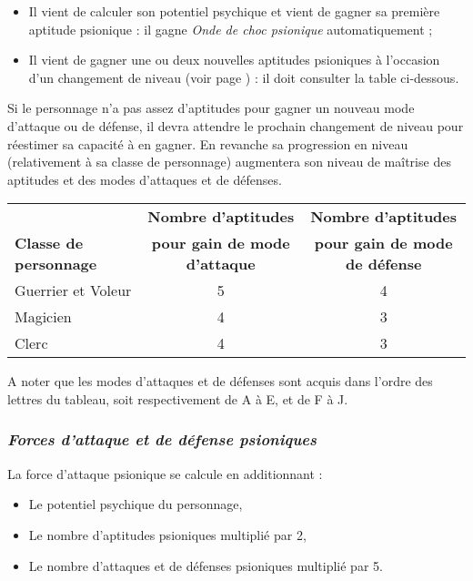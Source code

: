 \bigskip

\begin{itemize}
\item Il vient de calculer son potentiel psychique et vient de gagner sa première aptitude psionique : il gagne \textit{Onde de choc psionique} automatiquement ;
\item Il vient de gagner une ou deux nouvelles aptitudes psioniques à l'occasion d'un changement de niveau (voir page \pageref{aptitudes-gain}) : il doit consulter la table ci-dessous.
\end{itemize}

\bigskip

Si le personnage n'a pas assez d'aptitudes pour gagner un nouveau mode d'attaque ou de défense, il devra attendre le prochain changement de niveau pour réestimer sa capacité à en gagner. En revanche sa progression en niveau (relativement à sa classe de personnage) augmentera son niveau de maîtrise des aptitudes et des modes d'attaques et de défenses.


\bigskip

\begin{tabular}{lcc}
& \textbf{Nombre d'aptitudes} & \textbf{Nombre d'aptitudes} \\
\textbf{Classe de personnage} & \textbf{pour gain de mode d'attaque} & \textbf{pour gain de mode de défense} \\
Guerrier et Voleur & 5 & 4 \\
Magicien & 4 & 3 \\
Clerc & 4 & 3 \\
\end{tabular}

\bigskip

A noter que les modes d'attaques et de défenses sont acquis dans l'ordre des lettres du tableau, soit respectivement de A à E, et de F à J.

\subsubsection*{\textit{Forces d'attaque et de défense psioniques}}

La force d'attaque psionique se calcule en additionnant :

\bigskip

\begin{itemize}
\item Le potentiel psychique du personnage,
\item Le nombre d'aptitudes psioniques multiplié par 2,
\item Le nombre d'attaques et de défenses psioniques multiplié par 5.
\end{itemize}

